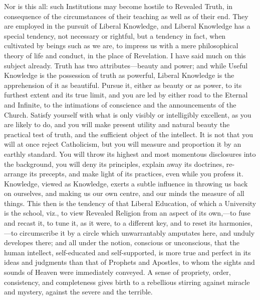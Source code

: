 Nor is this all: such Institutions may become hostile to Revealed
Truth, in consequence of the circumstances of their teaching as well
as of their end. They are employed in the pursuit of Liberal
Knowledge, and Liberal Knowledge has a special tendency, not necessary
or rightful, but a tendency in fact, when cultivated by beings such as
we are, to impress us with a mere philosophical theory of life
and conduct, in the place of Revelation. I have said much on this
subject already. Truth has two attributes—beauty and power; and
while Useful Knowledge is the possession of truth as powerful, Liberal
Knowledge is the apprehension of it as beautiful. Pursue it, either as
beauty or as power, to its furthest extent and its true limit, and you
are led by either road to the Eternal and Infinite, to the intimations
of conscience and the announcements of the Church. Satisfy yourself
with what is only visibly or intelligibly excellent, as you are likely
to do, and you will make present utility and natural beauty the
practical test of truth, and the sufficient object of the intellect.
It is not that you will at once reject Catholicism, but you will
measure and proportion it by an earthly standard. You will throw its
highest and most momentous disclosures into the background, you will
deny its principles, explain away its doctrines, re-arrange its
precepts, and make light of its practices, even while you profess it.
Knowledge, viewed as Knowledge, exerts a subtle influence in throwing
us back on ourselves, and making us our own centre, and our minds the
measure of all things. This then is the tendency of that Liberal
Education, of which a University is the school, viz., to view Revealed
Religion from an aspect of its own,—to fuse and recast it, to tune
it, as it were, to a different key, and to reset its harmonies,—to
circumscribe it by a circle which unwarrantably amputates here, and
unduly developes there; and all under the notion, conscious or
unconscious, that the human intellect, self-educated and
self-supported, is more true and perfect in its ideas and judgments
than that of Prophets and Apostles, to whom the sights and sounds of
Heaven were immediately conveyed. A sense of propriety, order,
consistency, and completeness gives birth to a rebellious
stirring against miracle and mystery, against the severe and the
terrible.

